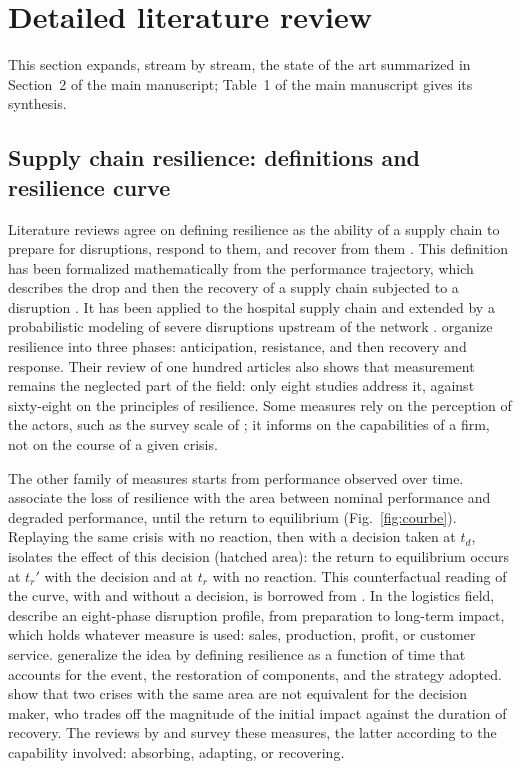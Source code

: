\section{Detailed literature review}
\label{sec:S2}

This section expands, stream by stream, the state of the art summarized in Section~2 of the main manuscript; Table~1 of the main manuscript gives its synthesis.

\subsection{Supply chain resilience: definitions and resilience curve}
\label{sec:ea-mesure}

Literature reviews agree on defining resilience as the ability of a supply chain to prepare for disruptions, respond to them, and recover from them \citep{tukamuhabwa2015, kamalahmadi2016}. This definition has been formalized mathematically from the performance trajectory, which describes the drop and then the recovery of a supply chain subjected to a disruption \citep{rahiel2026in4pl, rahiel2026these}. It has been applied to the hospital supply chain \citep{rahiel2025esd} and extended by a probabilistic modeling of severe disruptions upstream of the network \citep{rahiel2026codit}. \citet{kamalahmadi2016} organize resilience into three phases: anticipation, resistance, and then recovery and response. Their review of one hundred articles also shows that measurement remains the neglected part of the field: only eight studies address it, against sixty-eight on the principles of resilience. Some measures rely on the perception of the actors, such as the survey scale of \citet{chowdhury2017}; it informs on the capabilities of a firm, not on the course of a given crisis.

The other family of measures starts from performance observed over time. \citet{bruneau2003} associate the loss of resilience with the area between nominal performance and degraded performance, until the return to equilibrium (Fig.~\ref{fig:courbe}). Replaying the same crisis with no reaction, then with a decision taken at $t_d$, isolates the effect of this decision (hatched area): the return to equilibrium occurs at $t_r'$ with the decision and at $t_r$ with no reaction. This counterfactual reading of the curve, with and without a decision, is borrowed from \citet{rahiel2026in4pl}. In the logistics field, \citet{sheffirice2005} describe an eight-phase disruption profile, from preparation to long-term impact, which holds whatever measure is used: sales, production, profit, or customer service. \citet{henry2012} generalize the idea by defining resilience as a function of time that accounts for the event, the restoration of components, and the strategy adopted. \citet{zobel2011} show that two crises with the same area are not equivalent for the decision maker, who trades off the magnitude of the initial impact against the duration of recovery. The reviews by \citet{hosseini2016} and \citet{hosseini2019tre} survey these measures, the latter according to the capability involved: absorbing, adapting, or recovering.

